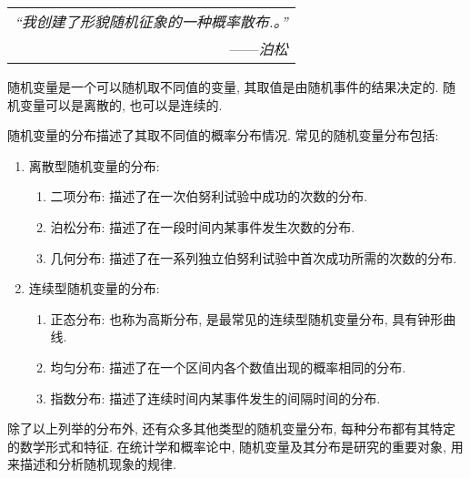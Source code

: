 \begin{flushright}
    \begin{tabular}{r|||}
        \textit{“我创建了形貌随机征象的一种概率散布.。”}\\
        ——\textit{泊松}
    \end{tabular}
\end{flushright}

随机变量是一个可以随机取不同值的变量, 其取值是由随机事件的结果决定的. 随机变量可以是离散的, 也可以是连续的. 

随机变量的分布描述了其取不同值的概率分布情况. 常见的随机变量分布包括: 
\begin{enumerate}
    \item 离散型随机变量的分布: \begin{enumerate}
        \item 二项分布: 描述了在一次伯努利试验中成功的次数的分布. 
        \item 泊松分布: 描述了在一段时间内某事件发生次数的分布. 
        \item 几何分布: 描述了在一系列独立伯努利试验中首次成功所需的次数的分布. 
    \end{enumerate}
    \item 连续型随机变量的分布: \begin{enumerate}
        \item 正态分布: 也称为高斯分布, 是最常见的连续型随机变量分布, 具有钟形曲线. 
        \item 均匀分布: 描述了在一个区间内各个数值出现的概率相同的分布. 
        \item 指数分布: 描述了连续时间内某事件发生的间隔时间的分布. 
    \end{enumerate}
\end{enumerate}

除了以上列举的分布外, 还有众多其他类型的随机变量分布, 每种分布都有其特定的数学形式和特征. 在统计学和概率论中, 随机变量及其分布是研究的重要对象, 用来描述和分析随机现象的规律. 
